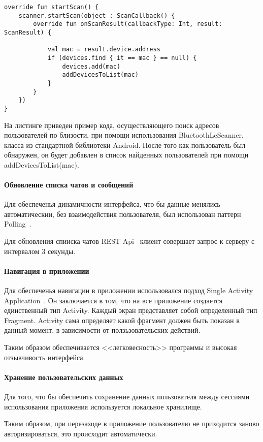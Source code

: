 \documentclass[explnote]{espd}
\begin{document}
\begin{verbatim}
override fun startScan() {
    scanner.startScan(object : ScanCallback() {
        override fun onScanResult(callbackType: Int, result: ScanResult) {

            val mac = result.device.address
            if (devices.find { it == mac } == null) {
                devices.add(mac)
                addDevicesToList(mac)
            }
        }
    })
}
\end{verbatim}

На листинге приведен пример кода, осуществляющего поиск адресов пользователей по близости, при помощи использования BluetoothLeScanner, класса из стандартной библиотеки Android. После того как пользователь был обнаружен, он будет добавлен в список найденных пользователей при помощи addDevicesToList(mac).

\paragraph{Обновление списка чатов и сообщений}
Для обеспеченья динамичности интерфейса, что бы данные менялись автоматическии, без взаимодействия пользователя, был использован паттерн Polling~\cite{polling}.

Для обновления спииска чатов REST Api~\cite{rest} клиент совершает запрос к серверу с интервалом 3 секунды.

\paragraph{Навигация в приложении}
Для обеспеченья навигации в приложении использовался подход Single Activity Application~\cite{SAA}. Он заключается в том, что на все приложение создается единственный тип Activity. Каждый экран представляет собой определенный тип Fragment. Activity сама определяет какой фрагмент должен быть показан в данный момент, в зависимости от ползьзовательских действий. 

Таким образом обеспечивается <<легковесность>> программы и высокая отзывчивость интерфейса.

\paragraph{Хранение пользовательских данных}
Для того, что бы обеспечить сохранение данных пользователя между сессиями использования приложения используется локальное хранилище.

Таким образом, при перезаходе в приложение пользователю не приходится заново авторизироваться, это происходит автоматически. 
\end{document}
